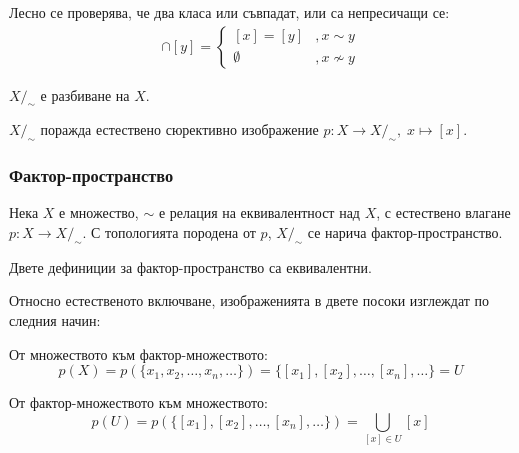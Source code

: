 \begin{fact}
    Лесно се проверява, че два класа или съвпадат, или са непресичащи се:
    \begin{eqnarray}
        [x] \cap [y] = \begin{cases}
            [x] = [y] &, x \sim y\\
            \emptyset &, x \not\sim y
        \end{cases}
    \end{eqnarray}
\end{fact}

\begin{corollary}
    $X/_\sim$ е разбиване на $X$.
\end{corollary}
\begin{corollary}
    $X/_\sim$ поражда естествено сюрективно изображение $p: X \to X/_\sim,\; x \mapsto [x]$.
\end{corollary}

\subsubsection{Фактор-пространство}
\begin{definition}
    Нека $X$ е множество, $\sim$ е релация на еквивалентност над $X$, с естествено влагане $p: X \to X/_\sim$. С топологията породена от $p$, $X/_\sim$ се нарича фактор-пространство.
\end{definition}
\begin{proposition}
    Двете дефиниции за фактор-пространство са еквивалентни.
\end{proposition}
\begin{fact}
    Относно естественото включване, изображенията в двете посоки изглеждат по следния начин:

    От множеството към фактор-множеството:
    \begin{equation}
        p(X) = p(\{x_1, x_2, \dots, x_n, \dots\}) = \{[x_1], [x_2], \dots, [x_n], \dots\} = U
    \end{equation}

    От фактор-множеството към множеството:
    \begin{equation}
        p(U) = p(\{[x_1], [x_2], \dots, [x_n], \dots\}) = \bigcup_{[x] \in U} [x]
    \end{equation}
\end{fact}

